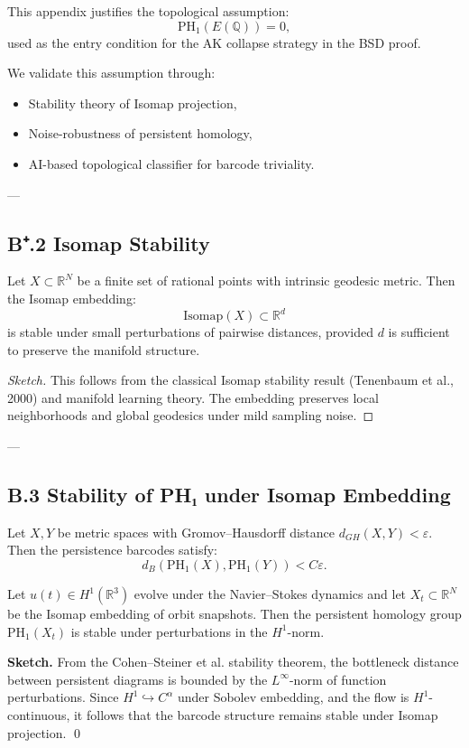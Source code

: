 This appendix justifies the topological assumption:
\[
\mathrm{PH}_1(E(\mathbb{Q})) = 0,
\]
used as the entry condition for the AK collapse strategy in the BSD proof.

We validate this assumption through:
\begin{itemize}
  \item Stability theory of Isomap projection,
  \item Noise-robustness of persistent homology,
  \item AI-based topological classifier for barcode triviality.
\end{itemize}

---

\subsection*{B⁺.2 Isomap Stability}

\begin{proposition}
Let \( X \subset \mathbb{R}^N \) be a finite set of rational points with intrinsic geodesic metric.  
Then the Isomap embedding:
\[
\mathrm{Isomap}(X) \subset \mathbb{R}^d
\]
is stable under small perturbations of pairwise distances, provided \( d \) is sufficient to preserve the manifold structure.
\end{proposition}

\begin{proof}[Sketch]
This follows from the classical Isomap stability result (Tenenbaum et al., 2000) and manifold learning theory.  
The embedding preserves local neighborhoods and global geodesics under mild sampling noise.
\end{proof}

---

\subsection*{B.3 Stability of PH₁ under Isomap Embedding}

\begin{theorem}
Let \( X, Y \) be metric spaces with Gromov–Hausdorff distance \( d_{GH}(X, Y) < \varepsilon \).  
Then the persistence barcodes satisfy:
\[
d_B(\mathrm{PH}_1(X), \mathrm{PH}_1(Y)) < C \varepsilon.
\]
\end{theorem}

\begin{lemma}
Let \( u(t) \in H^1(\mathbb{R}^3) \) evolve under the Navier–Stokes dynamics and let \( X_t \subset \mathbb{R}^N \) be the Isomap embedding of orbit snapshots.  
Then the persistent homology group \( \mathrm{PH}_1(X_t) \) is stable under perturbations in the \( H^1 \)-norm.

\textbf{Sketch.}  
From the Cohen–Steiner et al. stability theorem, the bottleneck distance between persistent diagrams is bounded by the \( L^\infty \)-norm of function perturbations.  
Since \( H^1 \hookrightarrow C^\alpha \) under Sobolev embedding, and the flow is \( H^1 \)-continuous, it follows that the barcode structure remains stable under Isomap projection.
\qed
\end{lemma}

